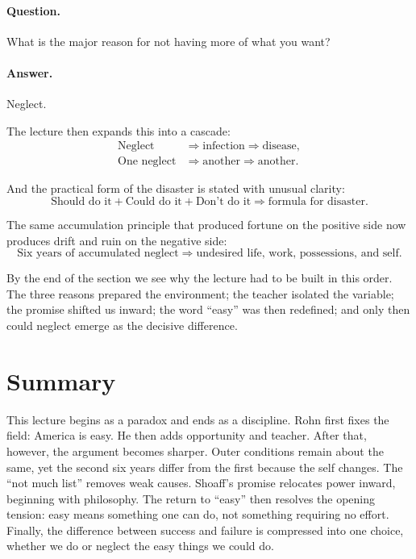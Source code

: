 \paragraph{Question.} What is the major reason for not having more of what you want?

\paragraph{Answer.} Neglect.

The lecture then expands this into a cascade:
\begin{align}
\text{Neglect} &\Longrightarrow \text{infection} \Longrightarrow \text{disease},\\
\text{One neglect} &\Longrightarrow \text{another} \Longrightarrow \text{another}.
\end{align}

And the practical form of the disaster is stated with unusual clarity:
\begin{equation}
\text{Should do it}+\text{Could do it}+\text{Don't do it}
\Longrightarrow
\text{formula for disaster}.
\end{equation}

The same accumulation principle that produced fortune on the positive side now produces drift and ruin on the negative side:
\begin{equation}
\text{Six years of accumulated neglect}
\Longrightarrow
\text{undesired life, work, possessions, and self}.
\end{equation}

By the end of the section we see why the lecture had to be built in this order. The three reasons prepared the environment; the teacher isolated the variable; the promise shifted us inward; the word ``easy'' was then redefined; and only then could neglect emerge as the decisive difference.

\section{Summary}

This lecture begins as a paradox and ends as a discipline. Rohn first fixes the field: America is easy. He then adds opportunity and teacher. After that, however, the argument becomes sharper. Outer conditions remain about the same, yet the second six years differ from the first because the self changes. The ``not much list'' removes weak causes. Shoaff's promise relocates power inward, beginning with philosophy. The return to ``easy'' then resolves the opening tension: easy means something one can do, not something requiring no effort. Finally, the difference between success and failure is compressed into one choice, whether we do or neglect the easy things we could do.

